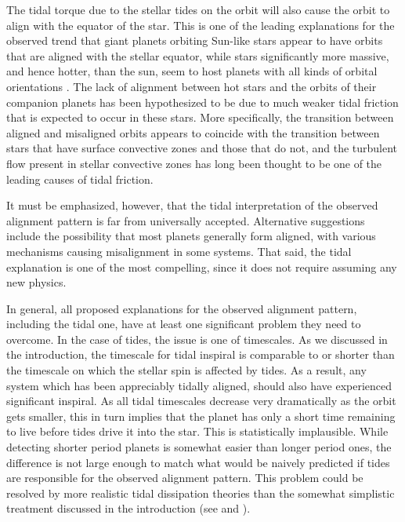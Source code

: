 The tidal torque due to the stellar tides on the orbit will also cause the orbit
to align with the equator of the star. This is one of the leading explanations
for the observed trend that giant planets orbiting Sun-like stars appear to
have orbits that are aligned with the stellar equator, while stars significantly
more massive, and hence hotter, than the sun, seem to host planets with all
kinds of orbital orientations \citep[c.f. chapter 5.2 of][]{Winn_Fabrycky_2015}.
The lack of alignment between hot stars and the orbits of their companion
planets has been hypothesized to be due to much weaker tidal friction that is
expected to occur in these stars. More specifically, the transition between
aligned and misaligned orbits appears to coincide with the transition between
stars that have surface convective zones and those that do not, and the
turbulent flow present in stellar convective zones has long been thought to be
one of the leading causes of tidal friction.

It must be emphasized, however, that the tidal interpretation of the observed
alignment pattern is far from universally accepted.  Alternative suggestions
include the possibility that most planets generally form aligned, with various
mechanisms causing misalignment in some systems. That said, the tidal
explanation is one of the most compelling, since it does not require assuming
any new physics.

In general, all proposed explanations for the observed alignment pattern,
including the tidal one, have at least one significant problem they need to
overcome. In the case of tides, the issue is one of timescales. As we discussed
in the introduction, the timescale for tidal inspiral is comparable to or
shorter than the timescale on which the stellar spin is affected by tides. As a
result, any system which has been appreciably tidally aligned, should also have
experienced significant inspiral. As all tidal timescales decrease very
dramatically as the orbit gets smaller, this in turn implies that the planet has
only a short time remaining to live before tides drive it into the star. This is
statistically implausible. While detecting shorter period planets is somewhat
easier than longer period ones, the difference is not large enough to match what
would be naively predicted if tides are responsible for the observed alignment
pattern. This problem could be resolved by more realistic tidal dissipation
theories than the somewhat simplistic treatment discussed in the introduction
(see \citep{Lai_12} and \citep{Anderson_et_al_21}).

